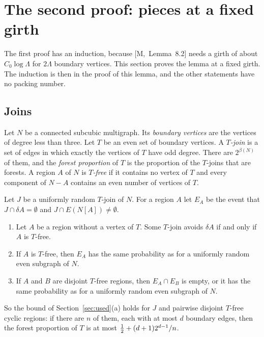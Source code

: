 \documentclass[11pt]{article}
\newcommand{\M}[1]{[M,~#1]}
\begin{document}
\section{The second proof: pieces at a fixed girth}\label{sec:second}

The first proof has an induction, because \M{Lemma~8.2} needs a girth of about
$C_0\log\Lambda$ for $2\Lambda$ boundary vertices. This section proves the lemma at a fixed
girth. The induction is then in the proof of this lemma, and the other statements have no packing
number.

\subsection{Joins}\label{sec:joins}

Let $N$ be a connected subcubic multigraph. Its \emph{boundary vertices} are the vertices of
degree less than three. Let $T$ be an even set of boundary vertices. A \emph{$T$-join} is a set of
edges in which exactly the vertices of $T$ have odd degree. There are $2^{\beta(N)}$ of them, and
the \emph{forest proportion} of $T$ is the proportion of the $T$-joins that are forests. A
region $A$ of $N$ is \emph{$T$-free} if it contains no vertex of $T$ and every component of $N-A$
contains an even number of vertices of $T$.

\begin{lemma}\label{lem:free}
Let $J$ be a uniformly random $T$-join of $N$. For a region $A$ let $E_A$ be the event that
$J\cap\delta A=\emptyset$ and $J\cap E(N[A])\ne\emptyset$.
\begin{enumerate}
\item[\textup{(i)}] Let $A$ be a region without a vertex of $T$. Some $T$-join avoids $\delta A$
if and only if $A$ is $T$-free.
\item[\textup{(ii)}] If $A$ is $T$-free, then $E_A$ has the same probability as for a uniformly
random even subgraph of $N$.
\item[\textup{(iii)}] If $A$ and $B$ are disjoint $T$-free regions, then $E_A\cap E_B$ is empty,
or it has the same probability as for a uniformly random even subgraph of $N$.
\end{enumerate}
So the bound of Section~\ref{sec:used}(a) holds for $J$ and pairwise disjoint $T$-free cyclic
regions: if there are $n$ of them, each with at most $d$ boundary edges, then the forest
proportion of $T$ is at most $\tfrac12+(d+1)2^{d-1}/n$.
\end{lemma}
\end{document}
